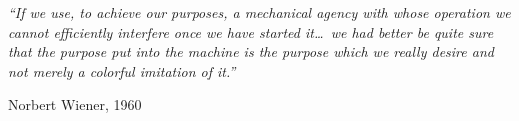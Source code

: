 \begin{epigraph}
\textit{``If we use, to achieve our purposes, a mechanical agency with whose operation we cannot efficiently interfere once we have started it\ldots\ we had better be quite sure that the purpose put into the machine is the purpose which we really desire and not merely a colorful imitation of it.''}\par
\vspace{1em}
\normalfont Norbert Wiener, 1960 %
\end{epigraph}